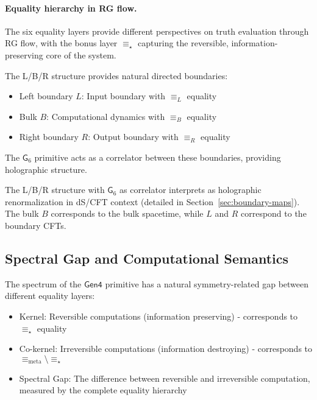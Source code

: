 \paragraph{Equality hierarchy in RG flow.} The six equality layers provide different perspectives on truth evaluation through RG flow, with the bonus layer $\equiv_\star$ capturing the reversible, information-preserving core of the system.

\begin{definition}
\label{def:directed-boundaries-truth}
The L/B/R structure provides natural directed boundaries:
\begin{itemize}
\item Left boundary $L$: Input boundary with $\equiv_L$ equality
\item Bulk $B$: Computational dynamics with $\equiv_B$ equality
\item Right boundary $R$: Output boundary with $\equiv_R$ equality
\end{itemize}
The $\mathsf{G}_6$ primitive acts as a correlator between these boundaries, providing holographic structure.
\end{definition}

\begin{remark}
\label{rem:holographic-renorm-truth}
The L/B/R structure with $\mathsf{G}_6$ as correlator interprets as holographic renormalization in dS/CFT context (detailed in Section~\ref{sec:boundary-maps}). The bulk $B$ corresponds to the bulk spacetime, while $L$ and $R$ correspond to the boundary CFTs.
\end{remark}

\subsection{Spectral Gap and Computational Semantics}

\begin{definition}
\label{def:spectral-gap-truth}
The spectrum of the $\mathsf{Gen4}$ primitive has a natural symmetry-related gap between different equality layers:
\begin{itemize}
\item Kernel: Reversible computations (information preserving) - corresponds to $\equiv_\star$ equality
\item Co-kernel: Irreversible computations (information destroying) - corresponds to $\equiv_{\text{meta}} \setminus \equiv_\star$
\item Spectral Gap: The difference between reversible and irreversible computation, measured by the complete equality hierarchy
\end{itemize}
\end{definition}

